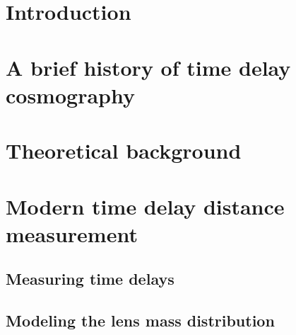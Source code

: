 \section{Introduction}
\label{sec:intro}




\section{A brief history of time delay cosmography}
\label{sec:history}




\section{Theoretical background}
\label{sec:theory}




\section{Modern time delay distance measurement}
\label{sec:measurement}




\subsection{Measuring time delays}
\label{ssec:timedelay}




\subsection{Modeling the lens mass distribution}
\label{ssec:lensmodel}




